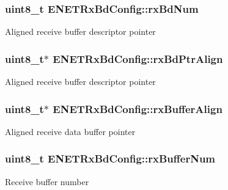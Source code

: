 \subsubsection[{\texorpdfstring{rx\+Bd\+Num}{rxBdNum}}]{\setlength{\rightskip}{0pt plus 5cm}uint8\+\_\+t E\+N\+E\+T\+Rx\+Bd\+Config\+::rx\+Bd\+Num}\hypertarget{structENETRxBdConfig_ae1752824f72b72c59be678487a2da34c}{}\label{structENETRxBdConfig_ae1752824f72b72c59be678487a2da34c}
Aligned receive buffer descriptor pointer 
\subsubsection[{\texorpdfstring{rx\+Bd\+Ptr\+Align}{rxBdPtrAlign}}]{\setlength{\rightskip}{0pt plus 5cm}uint8\+\_\+t$\ast$ E\+N\+E\+T\+Rx\+Bd\+Config\+::rx\+Bd\+Ptr\+Align}\hypertarget{structENETRxBdConfig_ab4ebbd55ffb2e447c30b153f4b142d69}{}\label{structENETRxBdConfig_ab4ebbd55ffb2e447c30b153f4b142d69}
Aligned receive buffer descriptor pointer 
\subsubsection[{\texorpdfstring{rx\+Buffer\+Align}{rxBufferAlign}}]{\setlength{\rightskip}{0pt plus 5cm}uint8\+\_\+t$\ast$ E\+N\+E\+T\+Rx\+Bd\+Config\+::rx\+Buffer\+Align}\hypertarget{structENETRxBdConfig_a437f8e078205842ce84ce6ae1739d476}{}\label{structENETRxBdConfig_a437f8e078205842ce84ce6ae1739d476}
Aligned receive data buffer pointer 
\subsubsection[{\texorpdfstring{rx\+Buffer\+Num}{rxBufferNum}}]{\setlength{\rightskip}{0pt plus 5cm}uint8\+\_\+t E\+N\+E\+T\+Rx\+Bd\+Config\+::rx\+Buffer\+Num}\hypertarget{structENETRxBdConfig_a69ff7bc55a2cafd74c2d8bcdf58a646a}{}\label{structENETRxBdConfig_a69ff7bc55a2cafd74c2d8bcdf58a646a}
Receive buffer number 
